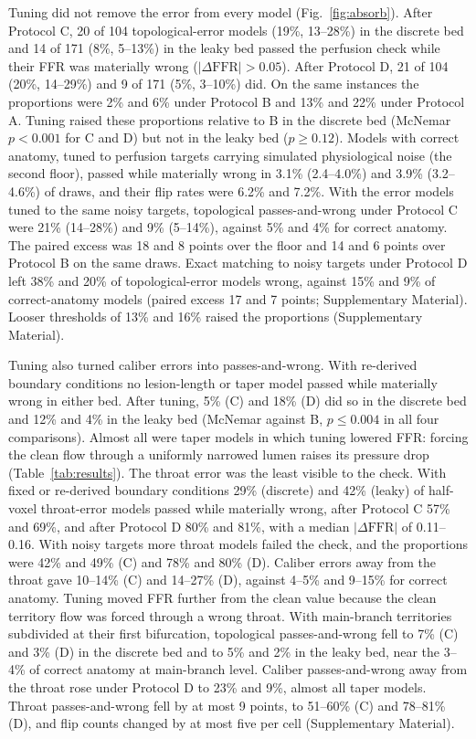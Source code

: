 \documentclass[journal,twoside,web]{ieeecolor}
\begin{document}
Tuning did not remove the error from every model (Fig.~\ref{fig:absorb}). After Protocol C, 20 of 104 topological-error models (19\%, 13--28\%) in the discrete bed and 14 of 171 (8\%, 5--13\%) in the leaky bed passed the perfusion check while their FFR was materially wrong ($|\Delta\mathrm{FFR}| > 0.05$). After Protocol D, 21 of 104 (20\%, 14--29\%) and 9 of 171 (5\%, 3--10\%) did. On the same instances the proportions were 2\% and 6\% under Protocol B and
13\% and 22\% under Protocol A. Tuning raised these proportions relative to B in the discrete bed (McNemar $p < 0.001$ for C and D)
but not in the leaky bed ($p \geq 0.12$). Models with
correct anatomy, tuned to perfusion targets carrying simulated physiological noise (the second floor), passed while materially wrong in 3.1\% (2.4--4.0\%) and 3.9\% (3.2--4.6\%) of draws, and their flip rates were 6.2\% and 7.2\%. With the error models tuned to the same noisy targets, topological passes-and-wrong under Protocol C were 21\% (14--28\%) and 9\% (5--14\%), against 5\% and 4\% for correct anatomy. The paired excess was 18 and 8 points over the floor and 14 and 6 points over Protocol B on the same draws. Exact matching to noisy targets under Protocol D left 38\% and 20\% of topological-error models wrong, against 15\% and 9\% of correct-anatomy models (paired excess 17 and 7 points; Supplementary Material).
Looser thresholds of 13\% and 16\% raised the proportions (Supplementary Material).

Tuning also turned caliber errors into passes-and-wrong. With re-derived boundary conditions no lesion-length or taper model
passed while materially wrong in either bed. After tuning, 5\% (C) and 18\% (D) did so in the discrete bed and 12\%
and 4\% in the leaky bed (McNemar against B, $p \leq 0.004$ in all four comparisons). Almost all were taper models
in which tuning lowered FFR: forcing the clean flow through a uniformly narrowed lumen raises its pressure drop
(Table~\ref{tab:results}). The throat error was the least visible to the check. With fixed or re-derived boundary conditions 29\% (discrete) and 42\% (leaky) of half-voxel throat-error models passed while materially wrong, after Protocol C 57\% and 69\%, and after Protocol D 80\% and 81\%, with a median $|\Delta\mathrm{FFR}|$ of 0.11--0.16. With noisy targets more throat models failed the check, and the proportions were 42\% and 49\% (C) and 78\% and 80\% (D). Caliber errors away from the throat gave 10--14\% (C) and 14--27\% (D), against 4--5\% and 9--15\% for correct anatomy. Tuning moved FFR further from the clean value because the clean territory flow was forced through a wrong throat.
With main-branch territories subdivided at their first bifurcation, topological passes-and-wrong fell to 7\% (C) and 3\% (D) in the discrete bed and to 5\% and 2\% in the leaky bed, near the 3--4\% of correct anatomy at main-branch level. Caliber passes-and-wrong away from the throat rose under Protocol D to 23\% and 9\%, almost all taper models. Throat passes-and-wrong fell by at most 9 points, to 51--60\% (C) and 78--81\% (D), and flip counts changed by at most five per cell (Supplementary Material).
\end{document}
